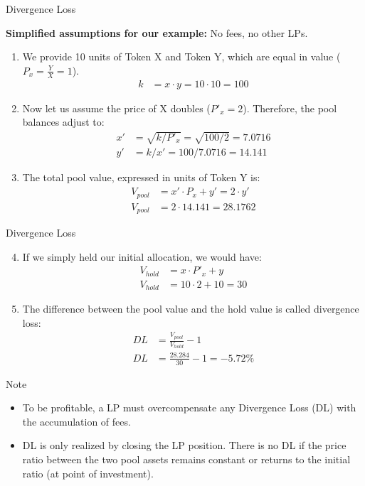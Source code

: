\documentclass[]{beamer}
\begin{document}
\begin{frame}{Divergence Loss}

	\textbf{Simplified assumptions for our example:} No fees, no other LPs. \\ 
		\begin{enumerate}
			\item We provide 10 units of Token X and Token Y, which are equal in value ($P_x = \tfrac{Y}{X} = 1$).
				\begin{align*}
					k &= x \cdot y = 10 \cdot 10 = 100	
				\end{align*}
			\item Now let us assume the price of X doubles ($P'_x = 2$). Therefore, the pool balances adjust to:
				\begin{align*}
					x' &= \sqrt{k/P'_{x}}	 = \sqrt{100/2} = 7.0716\\
					y' &= k / x' = 100 / 7.0716 = 14.141
				\end{align*}
			\item The total pool value, expressed in units of Token Y is: 
				\begin{align*}
					V_{pool} &= x' \cdot P_x + y' = 2 \cdot y'\\
					V_{pool} &= 2 \cdot 14.141 = 28.1762
				\end{align*}
		\end{enumerate}	
\end{frame}


\begin{frame}{Divergence Loss}

	\begin{enumerate}
	\setcounter{enumi}{3}
		\item If we simply held our initial allocation, we would have:
			\begin{align*}
				V_{hold} &= x \cdot P'_x + y\\
				V_{hold} &= 10 \cdot 2 + 10 = 30
			\end{align*}
		\item The difference between the pool value and the hold value is called divergence loss:
			\begin{align*}
				DL &= \tfrac{V_{pool}}{V_{hold}} - 1\\
				DL &= \tfrac{28.284}{30} - 1 = -5.72 \%
			\end{align*}
	\end{enumerate}	
	
	\begin{keytakeaway}{Note}
		\begin{itemize}
			\item To be profitable, a LP must overcompensate any Divergence Loss (DL) with the accumulation of fees.
			\item DL is only realized by closing the LP position. There is no DL if the price ratio between the two pool assets remains constant or returns to the initial ratio (at point of investment).
		\end{itemize}
	\end{keytakeaway}
	
\end{frame}
\end{document}
